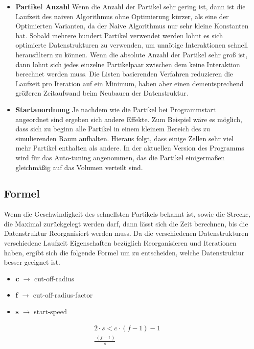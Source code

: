 \documentclass[
	12pt,
	a4paper,
	BCOR10mm,
	DIV14,
	headsepline,
]{scrreprt}
\begin{document}
\begin{itemize}
\begin{itemize}
		\item \textbf{Partikel Anzahl} Wenn die Anzahl der Partikel sehr gering ist, dann ist die Laufzeit des naiven Algorithmus ohne Optimierung kürzer, als eine der Optimierten Varianten, da der Naive Algorithmus nur sehr kleine Konstanten hat. Sobald mehrere hundert Partikel verwendet werden lohnt es sich optimierte Datenstrukturen zu verwenden, um unnötige Interaktionen schnell herausfiltern zu können. Wenn die absolute Anzahl der Partikel sehr groß ist, dann lohnt sich jedes einzelne Partikelpaar zwischen dem keine Interaktion berechnet werden muss. Die Listen basierenden Verfahren reduzieren die Laufzeit pro Iteration auf ein Minimum, haben aber einen dementsprechend größeren Zeitaufwand beim Neubauen der Datenstruktur. 
		\item \textbf{Startanordnung} Je nachdem wie die Partikel bei Programmstart angeordnet sind ergeben sich andere Effekte. Zum Beispiel wäre es möglich, dass sich zu beginn alle Partikel in einem kleinem Bereich des zu simulierenden Raum aufhalten. Hieraus folgt, dass einige Zellen sehr viel mehr Partikel enthalten als andere. In der aktuellen Version des Programms wird für das Auto-tuning angenommen, das die Partikel einigermaßen gleichmäßig auf das Volumen verteilt sind.
	\end{itemize}
\end{itemize}


\subsection{Formel}
Wenn die Geschwindigkeit des schnellsten Partikels bekannt ist, sowie die Strecke, die Maximal zurückgelegt werden darf, dann lässt sich die Zeit berechnen, bis die Datenstruktur Reorganisiert werden muss. Da die verschiedenen Datenstrukturen verschiedene Laufzeit Eigenschaften bezüglich Reorganisieren und Iterationen haben, ergibt sich die folgende Formel um zu entscheiden, welche Datenstruktur besser geeignet ist.
\begin{itemize}
	\item \textbf{c} $\rightarrow$ cut-off-radius
	\item \textbf{f} $\rightarrow$ cut-off-radius-factor
	\item \textbf{s} $\rightarrow$ start-speed
\end{itemize}

\begin{align*}
	2\cdot s < c \cdot (f - 1) - 1\\
	\frac{\cdot (f - 1)}{s}
\end{align*}
\end{document}
